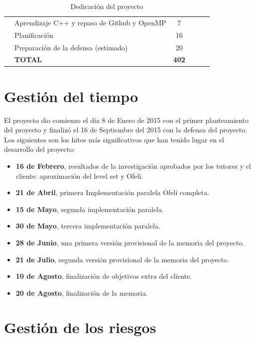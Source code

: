 \begin{table}[H]
\begin{tabular}{clcp{20mm}p{20mm}M{20mm}}
        & Aprendizaje C++ y repaso de Github y OpenMP  			& 7                    \\ \cmidrule(l){2-3}
        & Planificaci\'{o}n 								& 16 \\ \cmidrule(l){2-3}
        & Preparaci\'{o}n de la defensa (estimado)         		& 20                   \\ \midrule \midrule
        & \bf{TOTAL}            & \textbf{402} \\ \midrule                
	\end{tabular}
	\caption{Dedicaci\'{o}n del proyecto}	
	\label{dedicacionTemporal}	
\end{table}




\section{Gesti\'{o}n del tiempo}

El proyecto dio comienzo el d\'{i}a 8 de Enero de 2015 con el primer planteamiento del proyecto y finaliz\'{o} el 16 de Septiembre del 2015 con la defensa del proyecto. Los siguientes son los hitos m\'{a}s significativos que han tenido lugar en el desarrollo del proyecto:

\begin{itemize}
	\item \textbf{16 de Febrero},  resultados de la investigaci\'{o}n aprobados por los tutores y el cliente: aproximaci\'{o}n del level set y Ofeli.
	\item \textbf{21 de Abril}, primera Implementaci\'{o}n paralela Ofeli completa.
	\item \textbf{15 de Mayo}, segunda implementaci\'{o}n paralela.
	\item \textbf{30 de Mayo}, tercera implementaci\'{o}n paralela.
	\item \textbf{28 de Junio}, una primera versi\'{o}n provisional de la memoria del proyecto.
	\item \textbf{21 de Julio}, segunda versi\'{o}n provisional de la memoria del proyecto.
	\item \textbf{10 de Agosto}, finalizaci\'{o}n de objetivos extra del cliente.
	\item \textbf{20 de Agosto}, finalizaci\'{o}n de la memoria.
\end{itemize}




\section{Gesti\'{o}n de los riesgos}\label{riesgos}

